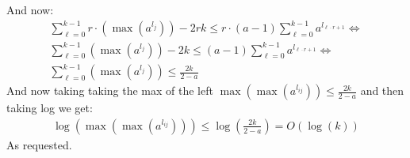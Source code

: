 And now:
\begin{gather*}
    \sum_{\ell=0}^{k-1} r\cdot(\max(a^{l_{j}})) - 2rk \leq r\cdot(a-1) \sum_{\ell=0}^{k-1} a^{l_{\ell\cdot r + 1}} \iff \\
    \sum_{\ell=0}^{k-1} (\max(a^{l_{j}})) - 2k \leq (a-1) \sum_{\ell=0}^{k-1} a^{l_{\ell\cdot r + 1}} \iff\\
    \sum_{\ell=0}^{k-1} (\max(a^{l_{j}}))\leq \frac{2k}{2-a}
\end{gather*}
And now taking taking the max of the left $\max(\max(a^{l_{ij}}))\leq \frac{2k}{2-a}$ and then taking log we get:
\begin{gather*}
    \log(\max(\max(a^{l_{ij}})))\leq \log\left(\frac{2k}{2-a}\right) = O(\log(k))
\end{gather*}
As requested.
